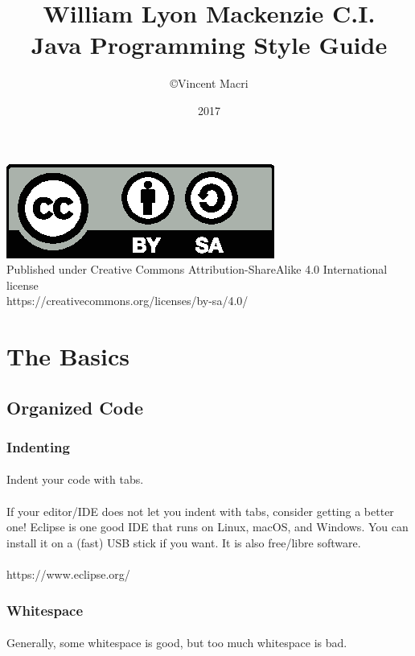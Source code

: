 \documentclass[12pt, letterpaper]{article}
\title{William Lyon Mackenzie C.I.\\Java Programming Style Guide}
\author{\copyright Vincent Macri}
\date{2017}
\begin{document}
	\maketitle
	\begin{center}
		\includegraphics{by-sa}
		\\
		Published under Creative Commons Attribution-ShareAlike 4.0 International license
		\\
		https://creativecommons.org/licenses/by-sa/4.0/
	\end{center}
	\tableofcontents
	\newpage
	
	\section{The Basics}
		\subsection{Organized Code}
			\subsubsection{Indenting}
				\paragraph{}
					Indent your code with tabs.
				\paragraph{}	
					If your editor/IDE does not let you indent with tabs, consider getting a better one! Eclipse is one good IDE that runs on Linux, macOS, and Windows. You can install it on a (fast) USB stick if you want. It is also free/libre software.
				\paragraph{}
					https://www.eclipse.org/
			\subsubsection{Whitespace}
				\paragraph{}
					Generally, some whitespace is good, but too much whitespace is bad.
\end{document}
